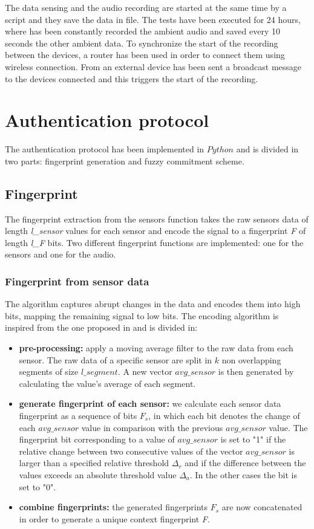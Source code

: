 The data sensing and the audio recording are started at the same time by a script and they save the data in file.
The tests have been executed for 24 hours, where has been constantly recorded the ambient audio and saved every 10 seconds the other ambient data.
To synchronize the start of the recording between the devices, a router has been used in order to connect them using wireless connection. 
From an external device has been sent a broadcast message to the devices connected and this triggers the start of the recording.

\section{Authentication protocol}
The authentication protocol has been implemented in $Python$ and is divided in two parts: fingerprint generation and fuzzy commitment scheme.

\subsection{Fingerprint}
The fingerprint extraction from the sensors function takes  the raw sensors data of length \textit{l\_sensor} values for each sensor and encode the signal to a fingerprint \textit{F} of length \textit{l\_F} bits. 
Two different fingerprint functions are implemented: one for the sensors and one for the audio.
\subsubsection{Fingerprint from sensor data}
The algorithm captures abrupt changes in the data and encodes them into high bits, mapping the remaining signal to low bits. 
The encoding algorithm is inspired from the one proposed in \cite{Nguyen2014Context-BasedDevices} and is divided in: 
\begin{itemize}
    \item \textbf{pre-processing:} apply a moving average filter to the raw data from each sensor. The raw data of a specific sensor are split in $k$ non overlapping segments of size $l\_segment$. A new vector $avg\_sensor$ is then generated by calculating the value's average of each segment.
    
    \item \textbf{generate fingerprint of each sensor:} we calculate each sensor data fingerprint as a sequence of bits $F_s$, in which each bit denotes the change of each $avg\_sensor$ value in comparison with the previous $avg\_sensor$ value. 
    The fingerprint bit corresponding to a value of $avg\_sensor$ is set to "1" if the relative change between two consecutive values of the vector $avg\_sensor$ is larger than a specified relative threshold $\Delta_r$ and if the difference between the values exceeds an absolute threshold value $\Delta_a$.
    In the other cases the bit is set to "0".
    \item \textbf{combine fingerprints:} the generated fingerprints $F_s$ are now concatenated in order to generate a unique context fingerprint \textit{F}. 
\end{itemize}

